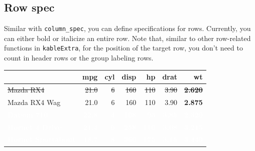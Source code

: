\documentclass[table]{article}
\newenvironment{Shaded}{\begin{snugshade}}{\end{snugshade}}
\newcommand{\DataTypeTok}[1]{\textcolor[rgb]{0.13,0.29,0.53}{#1}}
\newcommand{\DecValTok}[1]{\textcolor[rgb]{0.00,0.00,0.81}{#1}}
\newcommand{\KeywordTok}[1]{\textcolor[rgb]{0.13,0.29,0.53}{\textbf{#1}}}
\newcommand{\NormalTok}[1]{#1}
\newcommand{\OperatorTok}[1]{\textcolor[rgb]{0.81,0.36,0.00}{\textbf{#1}}}
\newcommand{\StringTok}[1]{\textcolor[rgb]{0.31,0.60,0.02}{#1}}
\begin{document}
\hypertarget{row-spec}{%
\subsection{Row spec}\label{row-spec}}

Similar with \texttt{column\_spec}, you can define specifications for
rows. Currently, you can either bold or italicize an entire row. Note
that, similar to other row-related functions in \texttt{kableExtra}, for
the position of the target row, you don't need to count in header rows
or the group labeling rows.

\begin{Shaded}
\end{Shaded}

\begin{table}[H]
\centering
\begin{tabular}{lrrrrr|>{\bfseries}r}
\toprule
  & mpg & cyl & disp & hp & drat & wt\\
\midrule
\sout{Mazda RX4} & \sout{21.0} & \sout{6} & \sout{160} & \sout{110} & \sout{3.90} & \sout{2.620}\\
Mazda RX4 Wag & 21.0 & 6 & 160 & 110 & 3.90 & 2.875\\
\rowcolor{black}  \textcolor{white}{\textbf{Datsun 710}} & \textcolor{white}{\textbf{22.8}} & \textcolor{white}{\textbf{4}} & \textcolor{white}{\textbf{108}} & \textcolor{white}{\textbf{93}} & \textcolor{white}{\textbf{3.85}} & \textcolor{white}{\textbf{2.320}}\\
\rowcolor{black}  \textcolor{white}{\textbf{Hornet 4 Drive}} & \textcolor{white}{\textbf{21.4}} & \textcolor{white}{\textbf{6}} & \textcolor{white}{\textbf{258}} & \textcolor{white}{\textbf{110}} & \textcolor{white}{\textbf{3.08}} & \textcolor{white}{\textbf{3.215}}\\
\rowcolor{black}  \textcolor{white}{\textbf{Hornet Sportabout}} & \textcolor{white}{\textbf{18.7}} & \textcolor{white}{\textbf{8}} & \textcolor{white}{\textbf{360}} & \textcolor{white}{\textbf{175}} & \textcolor{white}{\textbf{3.15}} & \textcolor{white}{\textbf{3.440}}\\
\bottomrule
\end{tabular}
\end{table}
\end{document}
